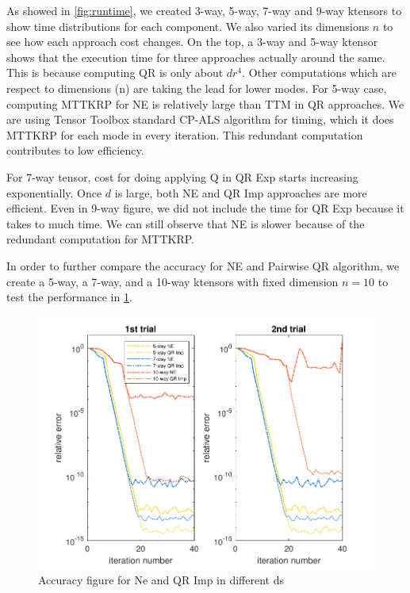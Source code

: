 \documentclass{article}
\begin{document}
As showed in \cref{fig:runtime}, we created 3-way, 5-way, 7-way and 9-way ktensors to show time distributions for each component.
We also varied its dimensions $n$ to see how each approach cost changes.
On the top, a 3-way and 5-way ktensor shows that the execution time for three approaches actually around the same.
This is because computing QR is only about $dr^4$.
Other computations which are respect to dimensions (n) are taking the lead for lower modes.
For 5-way case, computing MTTKRP for NE is relatively large than TTM in QR approaches.
We are using Tensor Toolbox standard CP-ALS algorithm for timing, which it does MTTKRP for each mode in every iteration.
This redundant computation contributes to low efficiency.


For 7-way tensor, cost for doing applying Q in QR Exp starts increasing exponentially.
Once $d$ is large, both NE and QR Imp approaches are more efficient.
Even in 9-way figure, we did not include the time for QR Exp because it takes to much time.
We can still observe that NE is slower because of the redundant computation for MTTKRP.



In order to further compare the accuracy for NE and Pairwise QR algorithm, we create a 5-way, a 7-way, and a 10-way ktensors with fixed dimension $n = 10$ to test the performance in \cref{fig:error}.

\begin{figure}[ht!]
  \begin{center}
    
    \includegraphics*[scale = 1.1]{sinsums_acc2.pdf}
    \caption[Figure]{Accuracy figure for Ne and QR Imp in different ds \label{fig:error}}
  \end{center}
  
\end{figure}
\end{document}
